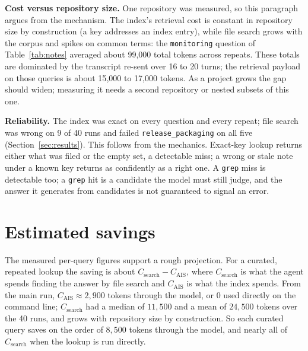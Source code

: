 \documentclass[11pt]{article}
\newcommand{\code}[1]{\texttt{#1}}
\begin{document}
\textbf{Cost versus repository size.} One repository was measured, so this
paragraph argues from the mechanism. The index's retrieval cost is
constant in repository size by construction (a key addresses an index entry), while file search
grows with the corpus and spikes on common terms: the \code{monitoring} question of
Table~\ref{tab:notes} averaged about 99{,}000 total tokens across repeats. These totals
are dominated by the transcript
re-sent over 16 to 20 turns; the retrieval payload on those queries is about
15{,}000 to 17{,}000 tokens. As a project grows the gap should widen; measuring
it needs a second repository or nested subsets of this one.

\textbf{Reliability.} The index was exact on every question and every repeat; file
search was wrong on 9 of 40 runs and failed \code{release\_packaging} on all five
(Section~\ref{sec:results}). This follows from the mechanics. Exact-key lookup returns
either what was filed or the empty set, a detectable miss; a wrong or stale note
under a known key returns as confidently as a right one. A \code{grep} miss is
detectable too; a \code{grep} hit is a candidate the model must still judge, and
the answer it generates from candidates is not guaranteed to signal an error.

\section{Estimated savings}

The measured per-query figures support a rough projection. For a curated, repeated
lookup the saving is about
$C_{\mathrm{search}} - C_{\mathrm{AIS}}$, where $C_{\mathrm{search}}$ is what the
agent spends finding the answer by file search and $C_{\mathrm{AIS}}$ is what the
index spends. From the main run, $C_{\mathrm{AIS}}\approx 2{,}900$ tokens
through the model, or $0$ used directly on the command line; $C_{\mathrm{search}}$
had a median of $11{,}500$ and a mean of $24{,}500$ tokens over the 40 runs,
and grows with repository size by construction. So each
curated query saves on the order of $8{,}500$ tokens through the model, and
nearly all of $C_{\mathrm{search}}$ when the lookup is run directly.
\end{document}
